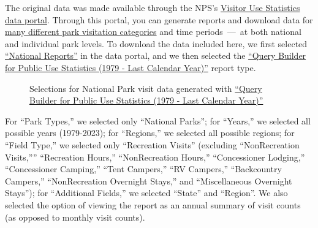 \documentclass[
  letterpaper,
  DIV=11,
  numbers=noendperiod]{scrartcl}
\begin{document}
The original data was made available through the NPS's
\href{https://irma.nps.gov/Stats/}{Visitor Use Statistics data portal}.
Through this portal, you can generate reports and download data for
\href{https://irma.nps.gov/Stats/Reports/National}{many different park
visitation categories} and time periods~---~at both national and
individual park levels. To download the data included here, we first
selected \href{https://irma.nps.gov/Stats/Reports/National}{``National
Reports''} in the data portal, and we then selected the
\href{https://irma.nps.gov/Stats/SSRSReports/National\%20Reports/Query\%20Builder\%20for\%20Public\%20Use\%20Statistics\%20(1979\%20-\%20Last\%20Calendar\%20Year)}{``Query
Builder for Public Use Statistics (1979 - Last Calendar Year)''} report
type.

\begin{figure}


\caption{\label{fig-query-builder}Selections for National Park visit
data generated with
\href{https://irma.nps.gov/Stats/SSRSReports/National\%20Reports/Query\%20Builder\%20for\%20Public\%20Use\%20Statistics\%20(1979\%20-\%20Last\%20Calendar\%20Year)}{``Query
Builder for Public Use Statistics (1979 - Last Calendar Year)''}}

\end{figure}%

For ``Park Types,'' we selected only ``National Parks''; for ``Years,''
we selected all possible years (1979-2023); for ``Regions,'' we selected
all possible regions; for ``Field Type,'' we selected only ``Recreation
Visits'' (excluding ``NonRecreation Visits,'''' ``Recreation Hours,''
``NonRecreation Hours,'' ``Concessioner Lodging,'' ``Concessioner
Camping,'' ``Tent Campers,'' ``RV Campers,'' ``Backcountry Campers,''
``NonRecreation Overnight Stays,'' and ``Miscellaneous Overnight
Stays''); for ``Additional Fields,'' we selected ``State'' and
``Region''. We also selected the option of viewing the report as an
annual summary of visit counts (as opposed to monthly visit counts).
\end{document}
